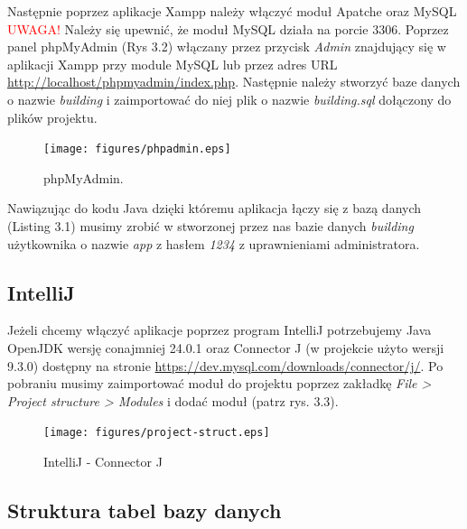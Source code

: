 \newpage
\noindent Następnie poprzez aplikacje Xampp należy włączyć moduł Apatche oraz MySQL
\textcolor{red}{UWAGA!} Należy się upewnić, że moduł MySQL działa na porcie 3306.
Poprzez panel phpMyAdmin (Rys 3.2) włączany przez przycisk \textit{Admin} znajdujący się w aplikacji
Xampp przy module MySQL lub przez adres URL  \url{http://localhost/phpmyadmin/index.php}.
Następnie należy stworzyć baze danych o nazwie \textit{building} i zaimportować
do niej plik o nazwie \textit{building.sql} dołączony do plików projektu.

\begin{figure}[H]
    \centering
    \texttt{[image: figures/phpadmin.eps]}\\
    \caption{phpMyAdmin.\label{fig2}}
\end{figure}

\noindent Nawiązując do kodu Java dzięki któremu aplikacja łączy się z bazą danych (Listing 3.1)
musimy zrobić w stworzonej przez nas bazie danych \textit{building} użytkownika o nazwie \textit{app} z hasłem \textit{1234} z uprawnieniami administratora.


\subsection{IntelliJ}
Jeżeli chcemy włączyć aplikacje poprzez program IntelliJ potrzebujemy Java OpenJDK wersję conajmniej 24.0.1 oraz Connector J (w projekcie użyto wersji 9.3.0)
dostępny na stronie \url{https://dev.mysql.com/downloads/connector/j/}.
Po pobraniu musimy zaimportować moduł do projektu poprzez zakładkę \textit{File > Project structure > Modules} i dodać moduł (patrz rys. 3.3).

\begin{figure}[H]
    \centering
    \texttt{[image: figures/project-struct.eps]}\\
    \caption{IntelliJ - Connector J\label{fig3}}
\end{figure}

\subsection{Struktura tabel bazy danych}

